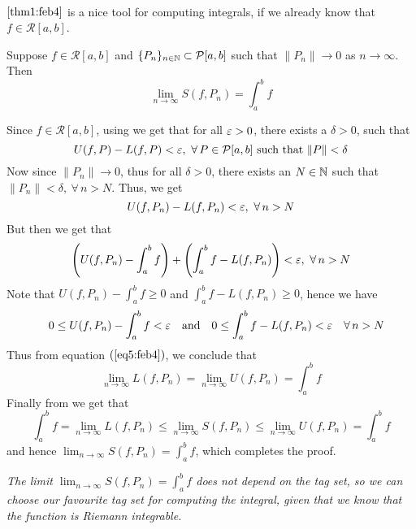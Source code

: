 \ 

 $\ref{thm1:feb4}$ is a nice tool for computing integrals, if we already know that $f \in \mathcal{R}[a,b]$.

\begin{thm}\label{thm2:feb4}
    Suppose $f \in \mathcal{R}[a,b]$ and $\{P_n\}_{n\in\mathbb{N}} \subset \mathcal{P}[a,b]$ such that $\| P_n \| \to 0$ as $n \to \infty$. Then 
    \[ 
        \lim_{n \to \infty} S(f,P_n) = \int_a^b f    
    \]
\end{thm}
\begin{prf}
    Since $f \in \mathcal{R}[a,b]$, using  we get that for all $\varepsilon > 0$, there exists a $\delta > 0$, such that 
    \[
        U(f,P) - L(f,P) < \eps, \ \forall \, P \in \mathcal{P}[a,b] \mbox{ such that } \|P\| < \delta  
    \]
    Now since $\|P_n\| \to 0$, thus for all $\delta > 0$, there exists an $N \in \mathbb{N}$ such that $\|P_n\| < \delta, \ \forall \, n > N$. Thus, we get 
    \[ 
        U(f, P_n) - L(f, P_n) < \varepsilon, \ \forall \, n > N    
    \]
    But then we get that 
    \[ 
        \left( U(f,P_n) - \int_a^b f \right) + \left( \int_a^b f - L(f,P_n) \right) < \varepsilon, \ \forall \, n > N    
    \]
    Note that $U(f,P_n) - \int_a^b f \geq 0$ and $\int_a^b f - L(f,P_n) \geq 0$, hence we have 
    \begin{align}\label{eq5:feb4}
        &&0 \leq U(f,P_n)-\int_a^b f < \varepsilon &&\mbox{and} &&0 \leq \int_a^b f - L(f,P_n) < \varepsilon &&\forall \, n > N
    \end{align}
    Thus from equation $(\ref{eq5:feb4})$, we conclude that 
    \[
        \lim_{n\to\infty} L(f,P_n) = \lim_{n\to\infty} U(f,P_n) = \int_a^b f  
    \]
    Finally from  we get that 
    \[
        \int_a^b f = \lim_{n\to\infty} L(f,P_n) \leq \lim_{n\to\infty}S(f,P_n) \leq \lim_{n\to\infty} U(f,P_n) = \int_a^b f  
    \]
    and hence $\lim_{n\to\infty} S(f,P_n) = \int_a^b f$, which completes the proof.
\end{prf}

\begin{exampleBox}
     \textit{The limit $\lim_{n\to\infty} S(f,P_n) = \int_a^b f$ does not depend on the tag set, so we can choose our favourite tag set for computing the integral, given that we know that the function is Riemann integrable.}
\end{exampleBox}

